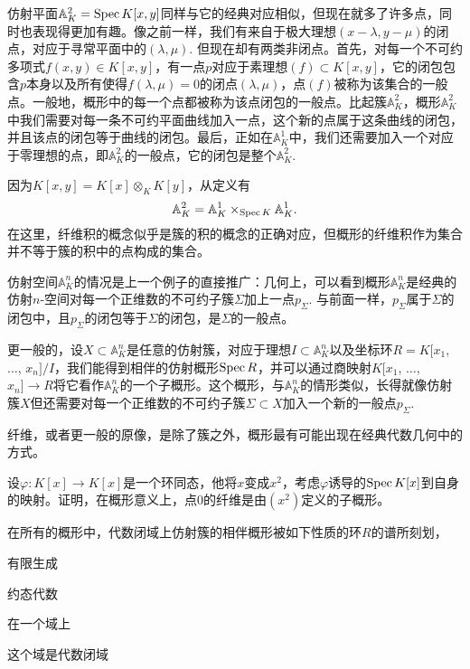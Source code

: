 
仿射平面$\mathbb{A}^2_K=\operatorname{Spec} K[x,y]$同样与它的经典对应相似，但现在就多了许多点，同时也表现得更加有趣。像之前一样，我们有来自于极大理想$(x-\lambda,y-\mu)$的闭点，对应于寻常平面中的$(\lambda,\mu)$. 但现在却有两类非闭点。首先，对每一个不可约多项式$f(x,y)\in K[x,y]$，有一点$p$对应于素理想$(f)\subset K[x,y]$，它的闭包包含$p$本身以及所有使得$f(\lambda,\mu)=0$的闭点$(\lambda,\mu)$，点$(f)$被称为该集合的一般点。一般地，概形中的每一个点都被称为该点闭包的一般点。比起簇$\mathbb{A}^2_K$，概形$\mathbb{A}^2_K$中我们需要对每一条不可约平面曲线加入一点，这个新的点属于这条曲线的闭包，并且该点的闭包等于曲线的闭包。最后，正如在$\mathbb{A}^1_K$中，我们还需要加入一个对应于零理想的点，即$\mathbb{A}^2_K$的一般点，它的闭包是整个$\mathbb{A}^2_K$.


因为$K[x,y]=K[x]\otimes_K K[y]$，从定义有
\[
	\mathbb{A}^2_K=\mathbb{A}^1_K\times_{\operatorname{Spec} K}\mathbb{A}^1_K.
\]
在这里，纤维积的概念似乎是簇的积的概念的正确对应，但概形的纤维积作为集合并不等于簇的积中的点构成的集合。

仿射空间$\mathbb{A}^n_K$的情况是上一个例子的直接推广：几何上，可以看到概形$\mathbb{A}^n_K$是经典的仿射$n$-空间对每一个正维数的不可约子簇$\Sigma$加上一点$p_\Sigma$. 与前面一样，$p_\Sigma$属于$\Sigma$的闭包中，且$p_\Sigma$的闭包等于$\Sigma$的闭包，是$\Sigma$的一般点。

更一般的，设$X\subset \mathbb{A}^n_K$是任意的仿射簇，对应于理想$I\subset \mathbb{A}^n_K$以及坐标环$R=K[x_1$, $\dots$, $x_n]/I$，我们能得到相伴的仿射概形$\operatorname{Spec} R$，并可以通过商映射$K[x_1$, $\dots$, $x_n]\to R$将它看作$\mathbb{A}^n_K$的一个子概形。这个概形，与$\mathbb{A}^n_K$的情形类似，长得就像仿射簇$X$但还需要对每一个正维数的不可约子簇$\Sigma\subset X$加入一个新的一般点$p_\Sigma$.

纤维，或者更一般的原像，是除了簇之外，概形最有可能出现在经典代数几何中的方式。

\begin{exe} \label{exe.2.2}
设$\varphi:K[x]\to K[x]$是一个环同态，他将$x$变成$x^2$，考虑$\varphi$诱导的$\operatorname{Spec} K[x]$到自身的映射。证明，在概形意义上，点$0$的纤维是由$(x^2)$定义的子概形。

\end{exe}

在所有的概形中，代数闭域上仿射簇的相伴概形被如下性质的环$R$的谱所刻划，
\begin{compactitem}[~~~--]
\item 有限生成
\item 约态代数
\item 在一个域上
\item 这个域是代数闭域
\end{compactitem}

